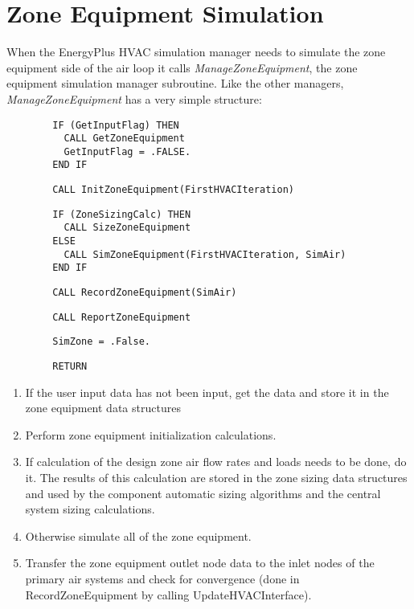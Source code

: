 \section{Zone Equipment Simulation}\label{zone-equipment-simulation}

When the EnergyPlus HVAC simulation manager needs to simulate the zone equipment side of the air loop it calls \emph{ManageZoneEquipment}, the zone equipment simulation manager subroutine. Like the other managers, \emph{ManageZoneEquipment} has a very simple structure:

\begin{lstlisting}
        IF (GetInputFlag) THEN
          CALL GetZoneEquipment
          GetInputFlag = .FALSE.
        END IF
\end{lstlisting}

\begin{lstlisting}
        CALL InitZoneEquipment(FirstHVACIteration)
\end{lstlisting}

\begin{lstlisting}
        IF (ZoneSizingCalc) THEN
          CALL SizeZoneEquipment
        ELSE
          CALL SimZoneEquipment(FirstHVACIteration, SimAir)
        END IF
\end{lstlisting}

\begin{lstlisting}
        CALL RecordZoneEquipment(SimAir)
\end{lstlisting}

\begin{lstlisting}
        CALL ReportZoneEquipment
\end{lstlisting}

\begin{lstlisting}
        SimZone = .False.
\end{lstlisting}

\begin{lstlisting}
        RETURN
\end{lstlisting}

\begin{enumerate}
\def\labelenumi{\arabic{enumi}.}
\item
  If the user input data has not been input, get the data and store it in the zone equipment data structures
\item
  Perform zone equipment initialization calculations.
\item
  If calculation of the design zone air flow rates and loads needs to be done, do it. The results of this calculation are stored in the zone sizing data structures and used by the component automatic sizing algorithms and the central system sizing calculations.
\item
  Otherwise simulate all of the zone equipment.
\item
  Transfer the zone equipment outlet node data to the inlet nodes of the primary air systems and check for convergence (done in RecordZoneEquipment by calling UpdateHVACInterface).
\end{enumerate}

